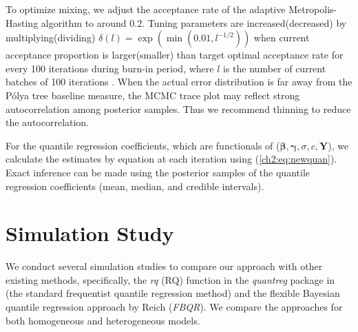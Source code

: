 \documentclass[12pt]{article}
\newcommand{\polya}{P\'{o}lya}
\begin{document}
To optimize mixing, we adjust the acceptance rate of the adaptive
Metropolis-Hasting algorithm to around 0.2.  Tuning parameters are
increased(decreased) by multiplying(dividing) $\delta(l) =
\exp(\min(0.01, l^{-1/2}))$ when current acceptance proportion is
larger(smaller) than target optimal acceptance rate for every 100
iterations during burn-in period, where $l$ is the number of current
batches of 100 iterations \citep{jara2009}. When the actual error
distribution is far away from the \polya{} tree baseline measure, the
MCMC trace plot may reflect strong autocorrelation among posterior
samples. Thus we recommend thinning to reduce the autocorrelation.

For the quantile regression coefficients, which are functionals of
($\bm \beta, \bm \gamma, \sigma, c, \bm Y$), we calculate the
estimates by equation at each iteration using
(\ref{ch2:eq:newquan}). Exact inference can be made using the posterior
samples of the quantile regression coefficients (mean, median, and
credible intervals).

\section{Simulation Study}
\label{ch2:sec:simulations}
We conduct several simulation studies to compare our approach with
other existing methods, specifically, the \textit{rq} (RQ) function in the
\textit{quantreg} package \citep{quantreg} in \cite{R} (the standard
frequentist quantile regression method) and the flexible Bayesian
quantile regression approach by Reich (\textit{FBQR}).  We compare the
approaches for both homogeneous and heterogeneous models.
\end{document}
